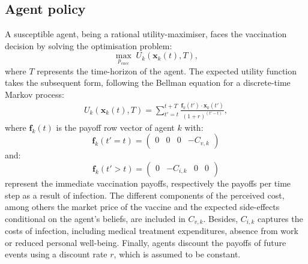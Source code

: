 \documentclass[11pt]{article}
\begin{document}
\subsection{Agent policy}

A susceptible agent, being a rational utility-maximiser, faces the vaccination decision by solving the optimisation problem:
\begin{equation}\label{eq:6}
	\max_{{p_{vacc}}} \; U_k(\mathbf{x}_k(t), T),
\end{equation}
where \(T\) represents the time-horizon of the agent. The expected utility function takes the subsequent form, following the Bellman equation for a discrete-time Markov process:
\begin{equation}\label{eq:7}
	\begin{split}
		U_k(\mathbf{x}_k(t), T) = \sum_{t'=t}^{t + T} \frac{  \mathbf{f}_k(t') \cdot \mathbf{x}_k(t')}{(1+r)^{(t'-t)}},
	\end{split}
\end{equation}
where \(\mathbf{f}_k(t)\) is the payoff row vector of agent \(k\) with: 
\begin{equation}\label{eq:8}
	\mathbf{f}_k(t' = t)=\left( \begin{array}{cccc}0&0&0&-C_{v,k} \end{array} \right)
\end{equation}
and:
\begin{equation}\label{eq:9}
\mathbf{f}_k(t' > t)=\left( \begin{array}{cccc} 0&-C_{i,k}&0&0 \end{array} \right)
\end{equation}
represent the immediate vaccination payoffs, respectively the payoffs per time step as a result of infection.  
The different components of the perceived cost, among others the market price of the vaccine and the expected side-effects conditional on the agent's beliefs, are included in \(C_{v,k}\). Besides, \(C_{i,k}\) captures the costs of infection, including medical treatment expenditures, absence from work or reduced personal well-being. Finally, agents discount the payoffs of future events using a discount rate \(r\), which is assumed to be constant.
\end{document}
